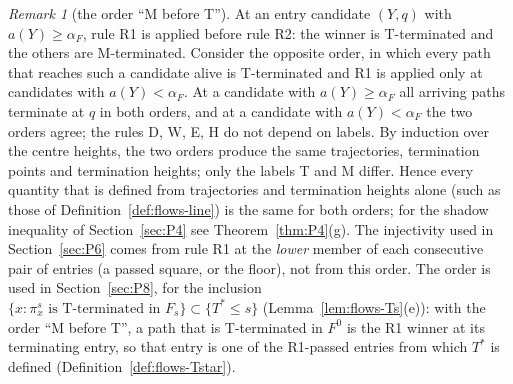 \documentclass[11pt]{amsart}
\newcommand{\Fz}{F^{0}}
\newcommand{\Tstar}{T^{*}}
\theoremstyle{definition}
\theoremstyle{remark}
\newtheorem{remark}[theorem]{Remark}
\numberwithin{equation}{section}
\begin{document}
\begin{remark}[the order ``M before T'']\label{rem:flows-order}
At an entry candidate $(Y,q)$ with $a(Y)\ge\alpha_F$, rule R1 is applied before rule R2: the winner is T-terminated
and the others are M-terminated. Consider the opposite order, in which every path that reaches such a candidate alive
is T-terminated and R1 is applied only at candidates with $a(Y)<\alpha_F$. At a candidate with $a(Y)\ge\alpha_F$ all
arriving paths terminate at $q$ in both orders, and at a candidate with $a(Y)<\alpha_F$ the two orders agree; the
rules D, W, E, H do not depend on labels. By induction over the centre heights, the two orders produce the same
trajectories, termination points and termination heights; only the labels T and M differ. Hence every quantity that is
defined from trajectories and termination heights alone (such as those of Definition~\ref{def:flows-line}) is the same
for both orders; for the shadow inequality of Section~\ref{sec:P4} see Theorem~\ref{thm:P4}(g). The injectivity used in
Section~\ref{sec:P6} comes from rule R1 at the \emph{lower} member of each consecutive pair of entries (a passed square,
or the floor), not from this order. The order is used in Section~\ref{sec:P8}, for the inclusion
$\{x:\pi^s_x\text{ is T-terminated in }F_s\}\subset\{\Tstar\le s\}$ (Lemma~\ref{lem:flows-Ts}(e)): with the order
``M before T'', a path that is T-terminated in $\Fz$ is the R1 winner at its terminating entry, so that entry is one of
the R1-passed entries from which $\Tstar$ is defined (Definition~\ref{def:flows-Tstar}).
\end{remark}
\end{document}
